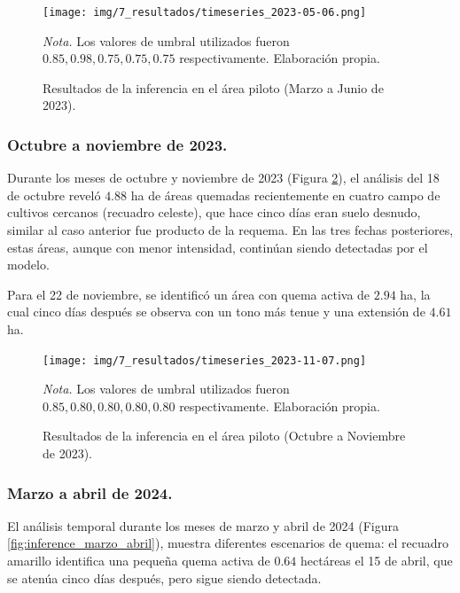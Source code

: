 \begin{figure}[H]
    \centering
    \caption{Resultados de la inferencia en el área piloto (Marzo a Junio de 2023).}
    \label{fig:inference_marzo_junio}
    \texttt{[image: img/7\_resultados/timeseries\_2023-05-06.png]}
    \begin{flushleft}
        \textit{Nota.} Los valores de umbral utilizados fueron $0.85, 0.98, 0.75, 0.75, 0.75$ respectivamente. Elaboración propia.
        \vspace{-\baselineskip}
    \end{flushleft}
\end{figure}
    
\subsubsection{Octubre a noviembre de 2023.}
Durante los meses de octubre y noviembre de 2023 (Figura \ref{fig:inference_octubre_noviembre}), el análisis del 18 de octubre reveló $4.88$ ha de áreas quemadas recientemente en cuatro campo de cultivos cercanos (recuadro celeste), que hace cinco días eran suelo desnudo, similar
al caso anterior fue producto de la requema. En las tres fechas posteriores, estas áreas, aunque con menor intensidad, continúan siendo detectadas por el modelo.

Para el 22 de noviembre, se identificó un área con quema activa de $2.94$ ha, la cual cinco días después se observa con un tono más tenue y una extensión de $4.61$ ha.

\begin{figure}[H]
    \centering
    \caption{Resultados de la inferencia en el área piloto (Octubre a Noviembre de 2023).}
    \label{fig:inference_octubre_noviembre}
    \texttt{[image: img/7\_resultados/timeseries\_2023-11-07.png]}
    \begin{flushleft}
        \textit{Nota.} Los valores de umbral utilizados fueron $0.85, 0.80, 0.80, 0.80, 0.80$ respectivamente. Elaboración propia.
        \vspace{-\baselineskip}
    \end{flushleft}
\end{figure}
    
\subsubsection{Marzo a abril de 2024.}
El análisis temporal durante los meses de marzo y abril de 2024 (Figura \ref{fig:inference_marzo_abril}),  muestra diferentes escenarios de quema: el recuadro amarillo identifica una pequeña quema activa de $0.64$ hectáreas el 15 de abril, que se atenúa 
cinco días después, pero sigue siendo detectada. 

